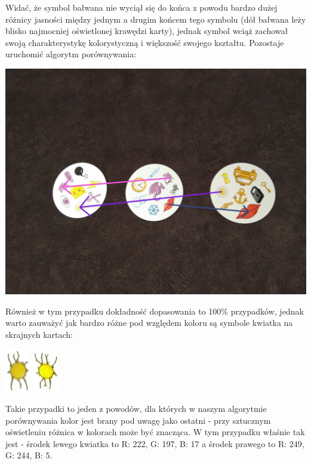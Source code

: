 \documentclass[10pt,a4paper]{article}
\begin{document}
Widać, że symbol bałwana nie wyciął się do końca z powodu bardzo dużej różnicy jasności między jednym a drugim końcem tego symbolu (dół bałwana leży blisko najmocniej oświetlonej krawędzi karty), jednak symbol wciąż zachował swoją charakterystykę kolorystyczną i większość swojego kształtu. 
\newpage
Pozostaje uruchomić algorytm porównywania:
\begin{center}
\includegraphics[scale=0.25]{2.2/img_arrows0.jpg}
\end{center}
Również w tym przypadku dokładność dopasowania to 100\% przypadków, jednak warto zauważyć jak bardzo różne pod względem koloru są symbole kwiatka na skrajnych kartach:
\begin{center}
\includegraphics[scale=1]{2.2/card1sign3.jpg}
\includegraphics[scale=1]{2.2/card2sign0.jpg}
\end{center}
Takie przypadki to jeden z powodów, dla których w naszym algorytmie porównywania kolor jest brany pod uwagę jako ostatni - przy sztucznym oświetleniu różnica w kolorach może być znacząca. W tym przypadku właśnie tak jest - środek lewego kwiatka to R: 222, G: 197, B: 17 a środek prawego to R: 249, G: 244, B: 5.
\newpage
\end{document}
